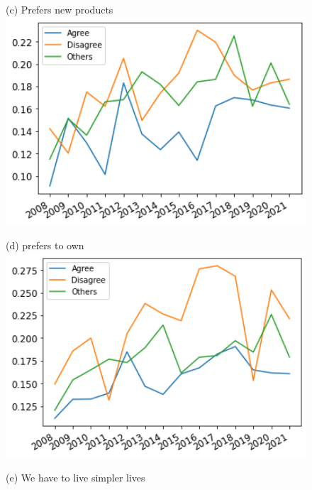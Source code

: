 \documentclass[12pt]{article}
\begin{document}
\begin{figure}[h!!]
\begin{minipage}[h!!]{0.32\textwidth}
\end{minipage}
\begin{minipage}[h!!]{0.32\textwidth}  
	\centering\footnotesize{(c) Prefers new products}
	\includegraphics[width=1\textwidth]{../codding_data/results/liss/broad_groups_notnecessaryqk20a148_ci307.png}
\end{minipage}
\begin{minipage}[h!!]{0.32\textwidth}  
\centering\footnotesize{(d) prefers to own}
\includegraphics[width=1\textwidth]{../codding_data/results/liss/broad_groups_notnecessaryqk20a144_ci307.png}
\end{minipage}
\begin{minipage}[h!!]{0.32\textwidth}  
\centering\footnotesize{(e) We have to live simpler lives}

\end{minipage}
\end{figure}
\end{document}
